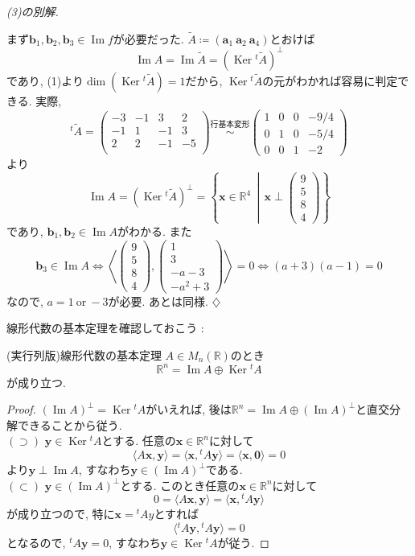 \documentclass[titlepage]{jsarticle}
\numberwithin{equation}{section}
\newcommand{\R}{\mathbb{R}}%
\newcommand{\Ker}{\operatorname{Ker}}
\renewcommand{\Im}{\operatorname{Im}}
\newenvironment{kaitou}[1][解]{%
\begin{proofbox}%
\textit{#1. }\ignorespaces
}{%
\hfill$\diamondsuit$%
\end{proofbox}%
}
\begin{document}
\begin{kaitou}[(3)の別解]
まず$\bm{b}_1, \bm{b}_2, \bm{b}_3 \in \Im f$が必要だった. $\tilde{A} \coloneq (\bm{a}_1\:\bm{a}_2\:\bm{a}_4)$とおけば
\[
\Im A = \Im \tilde{A} = (\Ker {}^t\!\tilde{A})^{\perp}
\]
であり, (1)より$\dim(\Ker {}^t\!\tilde{A}) = 1$だから, $\Ker {}^t\!\tilde{A}$の元がわかれば容易に判定できる. 実際,
\[
{}^t\!\tilde{A} =
\begin{pmatrix}
-3 & -1 & 3 & 2\\
-1 & 1 & -1 & 3\\
2 & 2 & -1 & -5\\
\end{pmatrix}
\overset{\text{行基本変形}}{\sim}
\begin{pmatrix}
1 & 0 & 0 & -9/4\\
0 & 1 & 0 & -5/4\\
0 & 0 & 1 & -2
\end{pmatrix}
\]
より
\[
\Im A = 
(\Ker {}^t\!\tilde{A})^{\perp}
=
\left\{
\bm{x} \in \R^4 \,\middle|\,
\bm{x} \perp
\begin{pmatrix}
9\\
5\\
8\\
4
\end{pmatrix}
\right\}
\]
であり, $\bm{b}_1, \bm{b}_2 \in \Im A$がわかる. また
\[
\bm{b}_3 \in \Im A \iff 
\left\langle 
\begin{pmatrix}
9\\
5\\
8\\
4
\end{pmatrix}
,
\begin{pmatrix}
1\\
3\\
-a-3\\
-a^2+3
\end{pmatrix}
\right\rangle
= 0
\iff
(a+3)(a-1) = 0 
\]
なので, $a = 1\:\text{or}\:-3$が必要. あとは同様.
\end{kaitou}
線形代数の基本定理を確認しておこう :
\begin{thm}{(実行列版)線形代数の基本定理}{}
$A \in M_n(\R)$のとき
\[
\R^n = \Im A \oplus \Ker {}^t\!A
\]
が成り立つ.
\end{thm}
\begin{proof}
$(\Im A)^{\perp} = \Ker {}^t\!A$がいえれば, 後は$\R^n = \Im A \oplus (\Im A)^{\perp}$と直交分解できることから従う.\\
$(\supset)$ $\bm{y} \in \Ker {}^t\!A$とする. 任意の$\bm{x} \in \R^n$に対して
\[
\langle A\bm{x}, \bm{y} \rangle = \langle \bm{x}, {}^t\!A\bm{y} \rangle = \langle \bm{x}, \bm{0} \rangle = 0 
\]
より$\bm{y} \perp \Im A$, すなわち$\bm{y} \in (\Im A)^{\perp}$である.\\
$(\subset)$ $\bm{y} \in (\Im A)^{\perp}$とする. このとき任意の$\bm{x} \in \R^n$に対して
\[
0 = \langle A\bm{x}, \bm{y} \rangle = \langle \bm{x}, \!^{t}A\bm{y} \rangle 
\]
が成り立つので, 特に$\bm{x} = {}^t\!Ay$とすれば
\[
\langle {}^t\!A\bm{y}, {}^t\!A\bm{y} \rangle = 0
\]
となるので, ${}^t\!A\bm{y} = 0$, すなわち$\bm{y} \in \Ker {}^t\!A$が従う.
\end{proof}
\end{document}
